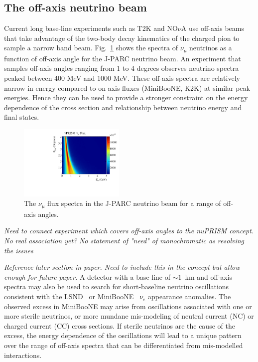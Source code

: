 \subsection{The off-axis neutrino beam}
Current long base-line experiments such as T2K and NO$\nu$A use off-axis beams that take advantage of the two-body
decay kinematics of the charged pion to sample a narrow band beam.  Fig.~\ref{fig:off-axis} shows the spectra of $\nu_{\mu}$ 
neutrinos as a function of off-axis angle for the J-PARC neutrino beam.  An experiment that samples off-axis angles ranging
from 1 to 4 degrees observes neutrino spectra peaked between 400 MeV and 1000 MeV.  These off-axis spectra are relatively 
narrow in energy compared to on-axis fluxes (MiniBooNE, K2K) at similar peak energies.  Hence they can be used to provide
a stronger constraint on the energy dependence of the cross section and relationship between neutrino energy and 
final states.  

\begin{figure}
 \begin{center}
  \includegraphics[width=0.45\textwidth]{figures/nuprism_oa_enu_numu.pdf}
  \caption{The $\nu_{\mu}$ flux spectra in the J-PARC neutrino beam for a range of off-axis angles.}
  \label{fig:off-axis}
  \end{center}
\end{figure}

{\color{red} \it Need to connect experiment which covers off-axis angles to the nuPRISM concept. No real association yet?  }
{\color{red} \it No statement of "need" of monochromatic as resolving the issues  }

{\color{red} \it Reference later section in paper. Need to include this in the concept but allow enough for future paper.   }
A detector with a base line of $\sim1$~km and off-axis spectra may also be used to search for short-baseline neutrino oscillations
consistent with the LSND~\cite{Athanassopoulos:1996jb} or MiniBooNE~\cite{Aguilar-Arevalo:2013pmq} $\nu_{e}$ appearance anomalies.  
The observed excess in MiniBooNE may arise from 
oscillations associated with one or more sterile neutrinos, or more mundane mis-modeling of neutral current (NC) or charged current (CC) 
cross sections.  If sterile neutrinos are the cause of the excess, the energy dependence of the oscillations will lead to a 
unique pattern over the range of off-axis spectra that can be differentiated from mis-modelled interactions.

